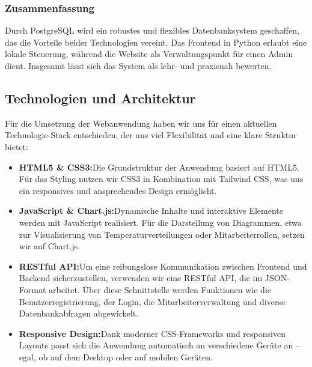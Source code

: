 \subsubsection{Zusammenfassung}
\label{subsubsec:zusammenfassung}

Durch PostgreSQL wird ein robustes und flexibles Datenbanksystem geschaffen, das die Vorteile beider Technologien vereint. Das Frontend in Python erlaubt eine lokale Steuerung, während die Website als Verwaltungspunkt für einen Admin dient. Insgesamt lässt sich das System als lehr- und praxisnah bewerten.


\subsection{Technologien und Architektur}
\label{subsec:technologien_und_architektur}


Für die Umsetzung der Webanwendung haben wir uns für einen aktuellen Technologie-Stack entschieden, der uns viel Flexibilität und eine klare Struktur bietet:

\begin{itemize}
    \item \textbf{HTML5 \& CSS3:}\newline Die Grundstruktur der Anwendung basiert auf HTML5. Für das Styling nutzen wir CSS3 in Kombination mit Tailwind CSS, was uns ein responsives und ansprechendes Design ermöglicht.
    \item \textbf{JavaScript \& Chart.js:}\newline Dynamische Inhalte und interaktive Elemente werden mit JavaScript realisiert. Für die Darstellung von Diagrammen, etwa zur Visualisierung von Temperaturverteilungen oder Mitarbeiterrollen, setzen wir auf Chart.js.
    \item \textbf{RESTful API:}\newline Um eine reibungslose Kommunikation zwischen Frontend und Backend sicherzustellen, verwenden wir eine RESTful API, die im JSON-Format arbeitet. Über diese Schnittstelle werden Funktionen wie die Benutzerregistrierung, der Login, die Mitarbeiterverwaltung und diverse Datenbankabfragen abgewickelt.
    \item \textbf{Responsive Design:}\newline Dank moderner CSS-Frameworks und responsiven Layouts passt sich die Anwendung automatisch an verschiedene Geräte an – egal, ob auf dem Desktop oder auf mobilen Geräten.
\end{itemize}


